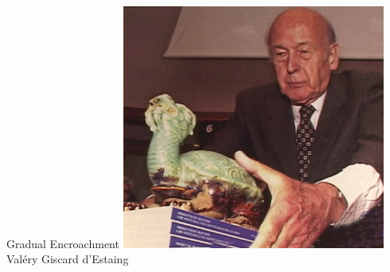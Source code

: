 %

\begin{frame}{Gradual Encroachment}
    \centering
    \includegraphics[width=0.65\textwidth]{img/french-pres.png} \\
    Val\'{e}ry Giscard d'Estaing \\
\end{frame}


